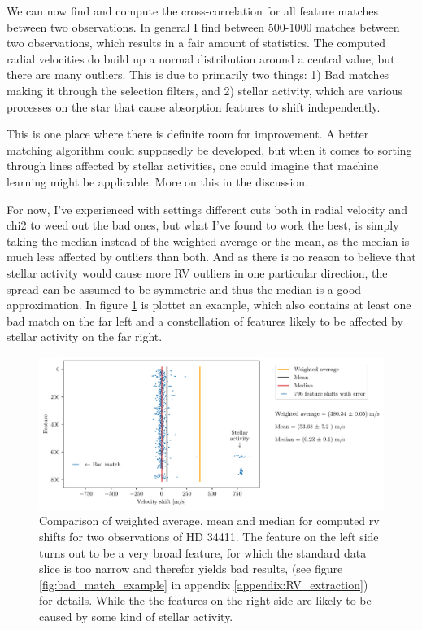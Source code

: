     We can now find and compute the cross-correlation for all feature matches between two observations. In general I find between 500-1000 matches between two observations, which results in a fair amount of statistics. The computed radial velocities do build up a normal distribution around a central value, but there are many outliers. This is due to primarily two things: 1) Bad matches making it through the selection filters, and 2) stellar activity, which are various processes on the star that cause absorption features to shift independently.
    
    This is one place where there is definite room for improvement. A better matching algorithm could supposedly be developed, but when it comes to sorting through lines affected by stellar activities, one could imagine that machine learning might be applicable. More on this in the discussion.

    For now, I've experienced with settings different cuts both in radial velocity and chi2 to weed out the bad ones, but what I've found to work the best, is simply taking the median instead of the weighted average or the mean, as the median is much less affected by outliers than both. And as there is no reason to believe that stellar activity would cause more RV outliers in one particular direction, the spread can be assumed to be symmetric and thus the median is a good approximation. In figure \ref{fig:median-mean-weighted-average} is plottet an example, which also contains at least one bad match on the far left and a constellation of features likely to be affected by stellar activity on the far right.

    \begin{figure}%
        \begin{wide}  
            \includegraphics[width=\textwidth]{figures/median-mean-weighted.pdf}
            \caption{Comparison of weighted average, mean and median for computed rv shifts for two observations of HD 34411. The feature on the left side turns out to be a very broad feature, for which the standard data slice is too narrow and therefor yields bad results, (see figure \ref{fig:bad_match_example} in appendix \ref{appendix:RV_extraction}) for details. While the the features on the right side are likely to be caused by some kind of stellar activity.}
        \label{fig:median-mean-weighted-average}
        \end{wide}
    \end{figure}

